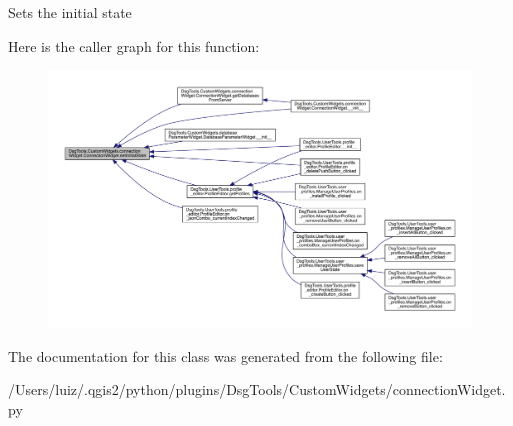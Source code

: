 \begin{DoxyVerb}Sets the initial state
\end{DoxyVerb}
 Here is the caller graph for this function\+:
\nopagebreak
\begin{figure}[H]
\begin{center}
\leavevmode
\includegraphics[width=350pt]{class_dsg_tools_1_1_custom_widgets_1_1connection_widget_1_1_connection_widget_a28b6fab24dc11d1aa3d81b5e22cd80bb_icgraph}
\end{center}
\end{figure}


The documentation for this class was generated from the following file\+:\begin{DoxyCompactItemize}
\item 
/\+Users/luiz/.\+qgis2/python/plugins/\+Dsg\+Tools/\+Custom\+Widgets/connection\+Widget.\+py\end{DoxyCompactItemize}
